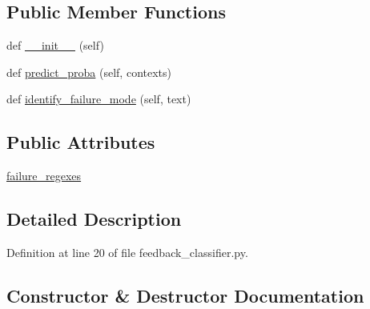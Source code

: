 \subsection*{Public Member Functions}
\begin{DoxyCompactItemize}
\item 
def \hyperlink{classprojects_1_1self__feeding_1_1feedback__classifier_1_1feedback__classifier_1_1FeedbackClassifierRegex_a9a8a64c3044529f2418ad7c0dff40bb3}{\+\_\+\+\_\+init\+\_\+\+\_\+} (self)
\item 
def \hyperlink{classprojects_1_1self__feeding_1_1feedback__classifier_1_1feedback__classifier_1_1FeedbackClassifierRegex_a31bd7f9578428ad2cf1921c4fbf51ba8}{predict\+\_\+proba} (self, contexts)
\item 
def \hyperlink{classprojects_1_1self__feeding_1_1feedback__classifier_1_1feedback__classifier_1_1FeedbackClassifierRegex_a24119cead515b84ee7308a53f821e681}{identify\+\_\+failure\+\_\+mode} (self, text)
\end{DoxyCompactItemize}
\subsection*{Public Attributes}
\begin{DoxyCompactItemize}
\item 
\hyperlink{classprojects_1_1self__feeding_1_1feedback__classifier_1_1feedback__classifier_1_1FeedbackClassifierRegex_a425d14474da43ffb0a75150fa04b26bc}{failure\+\_\+regexes}
\end{DoxyCompactItemize}


\subsection{Detailed Description}


Definition at line 20 of file feedback\+\_\+classifier.\+py.



\subsection{Constructor \& Destructor Documentation}
\mbox{\label{classprojects_1_1self__feeding_1_1feedback__classifier_1_1feedback__classifier_1_1FeedbackClassifierRegex_a9a8a64c3044529f2418ad7c0dff40bb3}} 
